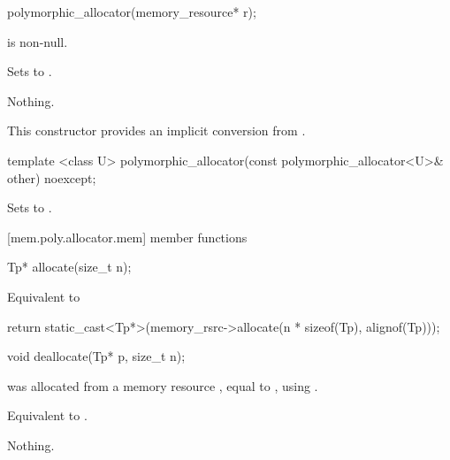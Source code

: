 %
\begin{itemdecl}
polymorphic_allocator(memory_resource* r);
\end{itemdecl}

\begin{itemdescr}
\pnum
\requires
{} is non-null.

\pnum
\effects
Sets  to .

\pnum
\throws
Nothing.

\pnum
\begin{note}
This constructor provides an implicit conversion from .
\end{note}
\end{itemdescr}

%
\begin{itemdecl}
template <class U>
  polymorphic_allocator(const polymorphic_allocator<U>& other) noexcept;
\end{itemdecl}

\begin{itemdescr}
\pnum
\effects
Sets  to .
\end{itemdescr}


[mem.poly.allocator.mem]{ member functions}

%
\begin{itemdecl}
Tp* allocate(size_t n);
\end{itemdecl}

\begin{itemdescr}
\pnum
\returns
Equivalent to
\begin{codeblock}
return static_cast<Tp*>(memory_rsrc->allocate(n * sizeof(Tp), alignof(Tp)));
\end{codeblock}
\end{itemdescr}

%
\begin{itemdecl}
void deallocate(Tp* p, size_t n);
\end{itemdecl}

\begin{itemdescr}
\pnum
\requires
{} was allocated from a memory resource ,
equal to ,
using .

\pnum
\effects
Equivalent to .

\pnum
\throws
Nothing.
\end{itemdescr}

